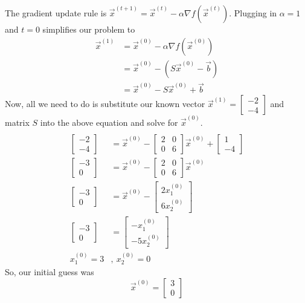 \documentclass[11pt]{article}
\begin{document}
\begin{prob}
\begin{subprob}
\begin{solution}
The gradient update rule is $\vec x^{(t+1)} = \vec x^{(t)} - \alpha \nabla f(\vec x^{(t)})$. Plugging in $\alpha = 1$ and $t = 0$ simplifies our problem to
\begin{align*}
\vec x^{(1)} &= \vec x^{(0)}-\alpha \nabla f(\vec x^{(0)})
\\&= \vec x^{(0)}-(S\vec x^{(0)}-\vec b)
\\&= \vec x^{(0)}-S\vec x^{(0)}+\vec b
\end{align*}
Now, all we need to do is substitute our known vector $\vec x^{(1)} = \begin{bmatrix} - 2 \\ -4 \end{bmatrix}$ and matrix $S$ into the above equation and solve for $\vec x^{(0)}$.
\begin{align*}
\\\begin{bmatrix} - 2 \\ -4 \end{bmatrix}&= \vec x^{(0)}-\begin{bmatrix} 2 & 0 \\ 0 & 6 \end{bmatrix}\vec x^{(0)}+\begin{bmatrix} 1 \\ -4 \end{bmatrix}
\\\begin{bmatrix} - 3 \\ 0 \end{bmatrix}&= \vec x^{(0)}-\begin{bmatrix} 2 & 0 \\ 0 & 6 \end{bmatrix}\vec x^{(0)}
\\\begin{bmatrix} - 3 \\ 0 \end{bmatrix}&= \vec x^{(0)}-\begin{bmatrix} 2x^{(0)}_1 \\ 6x^{(0)}_2 \end{bmatrix}
\\\begin{bmatrix} - 3 \\ 0 \end{bmatrix}&= \begin{bmatrix} -x^{(0)}_1 \\ -5x^{(0)}_2 \end{bmatrix} \\ x^{(0)}_1=3 &, \: x^{(0)}_2 = 0
\end{align*}
So, our initial guess was
$$
\boxed{\vec x^{(0)}=\begin{bmatrix}3 \\ 0 \end{bmatrix}}
$$
\end{solution}
\end{subprob}

\end{prob}
\end{document}
